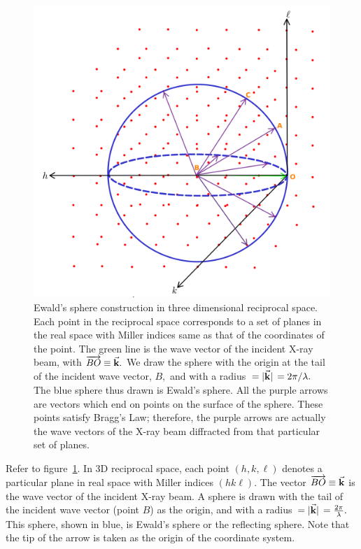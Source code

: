 	\begin{figure}
	\centering
	\includegraphics[scale=0.15]{ewald_sphere.png}
	\caption{\label{fig:ewald_sphere}Ewald's sphere construction in three dimensional reciprocal space. Each point in the reciprocal space corresponds to a set of planes in the real space with Miller indices same as that of the coordinates of the point. The green line is the wave vector of the incident X-ray beam, with $\overrightarrow{BO} \equiv \va{k}.$ We draw the sphere with the origin at the tail of the incident wave vector, $B,$ and with a radius~$= \abs*{\va{k}} = 2\pi / \lambda.$ The blue sphere thus drawn is Ewald's sphere. All the purple arrows are vectors which end on points on the surface of the sphere. These points satisfy Bragg's Law; therefore, the purple arrows are actually the wave vectors of the X-ray beam diffracted from that particular set of planes.}
	\end{figure}
	
	Refer to figure~\ref{fig:ewald_sphere}. In 3D reciprocal space, each point $(h, k, \ell)$ denotes a particular plane in real space with Miller indices $(hk\ell).$ The vector $\overrightarrow{BO} \equiv \va{k}$ is the wave vector of the incident X-ray beam. A sphere is drawn with the tail of the incident wave vector (point $B$) as the origin, and with a radius~$= \abs*{\va{k}} = \frac{2\pi}{\lambda}.$ This sphere, shown in blue, is Ewald's sphere or the reflecting sphere. Note that the tip of the arrow is taken as the origin of the coordinate system.
	
